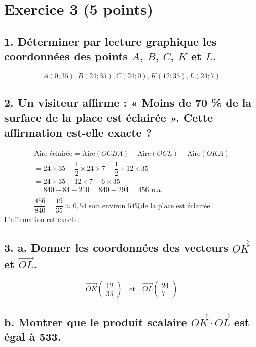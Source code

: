 \section*{Exercice 3 (5 points)}	
	\subsection*{1. Déterminer par lecture graphique les coordonnées des points $A$, $B$, $C$, $K$ et $L$.}
	
	\[
	A(0; 35), B(24; 35), C(24; 0), K(12; 35), L(24; 7)
	\]
	
	\subsection*{2. Un visiteur affirme : « Moins de 70 \% de la surface de la place est éclairée ». Cette affirmation est-elle exacte ?}
	
	\[
	\begin{array}{l}
		\text{Aire éclairée} = \text{Aire}(OCBA) - \text{Aire}(OCL) - \text{Aire}(OKA) \\
		= 24 \times 35 - \dfrac{1}{2} \times 24 \times 7 - \dfrac{1}{2} \times 12 \times 35 \\
		= 24 \times 35 - 12 \times 7 - 6 \times 35 \\
		= 840 - 84 - 210 = 840 - 294 = 456 \text{ u.a.} \\
		\\
		\dfrac{456}{840} = \dfrac{19}{35} \approx 0,54 \text{ soit environ 54\% de la place est éclairée.}
	\end{array}
	\]
L’affirmation est exacte.
	
	\subsection*{3. a. Donner les coordonnées des vecteurs $\overrightarrow{OK}$ et $\overrightarrow{OL}$.}
	
	\[
	\overrightarrow{OK} \left( \begin{array}{c} 12 \\ 35 \end{array} \right) \quad \text{et} \quad \overrightarrow{OL} \left( \begin{array}{c} 24 \\ 7 \end{array} \right)
	\]
	
	\subsection*{b. Montrer que le produit scalaire $\overrightarrow{OK} \cdot \overrightarrow{OL}$ est égal à 533.}
	
